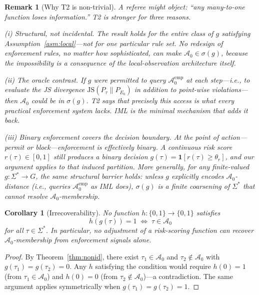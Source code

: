 \documentclass[11pt]{article}
\newtheorem{corollary}[theorem]{Corollary}
\newtheorem{remark}{Remark}[section]
\newcommand{\Sigstar}{\Sigma^{*}}
\newcommand{\Azero}{\mathcal{A}_0}
\newcommand{\sigg}{\sigma(g)}
\newcommand{\JS}{\mathrm{JS}}
\begin{document}
\begin{remark}[Why T2 is non-trivial]
\label{rem:nontrivial}
A referee might object: ``any many-to-one function loses information.''
T2 is stronger for three reasons.

\emph{(i) Structural, not incidental.}
The result holds for the \emph{entire class} of $g$ satisfying
Assumption~\ref{asm:local}---not for one particular rule set.
No redesign of enforcement rules, no matter how sophisticated, can make
$\Azero \in \sigg$, because the impossibility is a consequence of the
local-observation architecture itself.

\emph{(ii) The oracle contrast.}
If $g$ were permitted to query $\Azero^{\mathrm{emp}}$ at each step---i.e.,
to evaluate the JS divergence $\JS(P_\tau \| P_{E_0})$ in addition to point-wise
violations---then $\Azero$ \emph{could} be in $\sigma(g)$.  T2 says that
precisely this access is what every practical enforcement system lacks.
IML is the minimal mechanism that adds it back.

\emph{(iii) Binary enforcement covers the decision boundary.}
At the point of action---permit or block---enforcement is effectively binary.
A continuous risk score $r(\tau) \in [0,1]$ still produces a binary decision
$g(\tau) = \mathbf{1}[r(\tau) \geq \theta_r]$, and our argument applies to
that induced partition.  More generally, for any finite-valued
$g : \Sigstar \to G$, the same structural barrier holds: unless $g$ explicitly
encodes $\Azero$-distance (i.e., queries $\Azero^{\mathrm{emp}}$ as IML does),
$\sigg$ is a finite coarsening of $\Sigstar$ that cannot resolve
$\Azero$-membership.
\end{remark}

\begin{corollary}[Irrecoverability]
\label{cor:irrecov}
No function $h : \{0,1\} \to \{0,1\}$ satisfies
\[
  h(g(\tau)) = 1 \;\iff\; \tau \in \Azero
\]
for all $\tau \in \Sigstar$.  In particular, no adjustment of a risk-scoring
function can recover $\Azero$-membership from enforcement signals alone.
\end{corollary}

\begin{proof}
By Theorem~\ref{thm:nonid}, there exist $\tau_1 \in \Azero$ and
$\tau_2 \notin \Azero$ with $g(\tau_1) = g(\tau_2) = 0$.  Any $h$
satisfying the condition would require $h(0) = 1$ (from $\tau_1 \in \Azero$)
and $h(0) = 0$ (from $\tau_2 \notin \Azero$)---a contradiction.
The same argument applies symmetrically when $g(\tau_1) = g(\tau_2) = 1$.
\end{proof}
\end{document}
